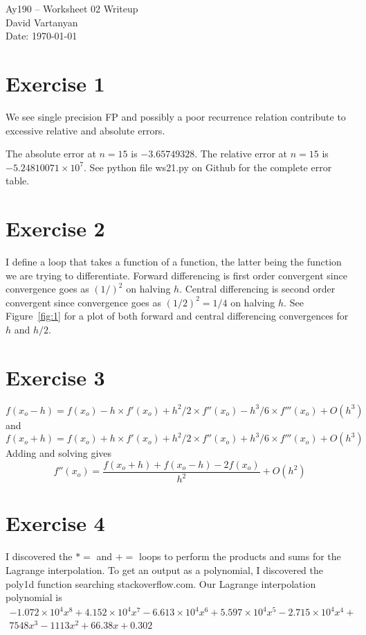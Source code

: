 \documentclass[11pt,letterpaper]{article}
\begin{document}
\begin{center}
\Large
Ay190 -- Worksheet 02 Writeup\\
David Vartanyan\\
Date: \today
\end{center}

\section{Exercise 1}
We see single precision FP and possibly a poor recurrence relation contribute to excessive relative and absolute errors.

The absolute error at $n=15$ is $-3.65749328$. \newline The relative error at $n=15$ is $-5.24810071 \times 10^7$. See python file ws21.py on Github for the complete error table.

\section{Exercise 2}
I define a loop that takes a function of a function, the latter being the function we are trying to differentiate. Forward differencing is first order convergent since convergence goes as $(1/)^2$ on halving $h$. Central differencing is second order convergent since convergence goes as $(1/2)^2=1/4$ on halving $h$. \newline See Figure~\ref{fig:1} for a plot of both forward and central differencing convergences for $h$ and $h/2$.



\section{Exercise 3}

\begin{equation}
f(x_o-h)= f(x_o) - h \times f'(x_o) + h^2/2 \times f''(x_o) - h^3/6 \times f'''(x_o) + O(h^3)
\end{equation}
and
\begin{equation}
f(x_o+h)= f(x_o) + h \times f'(x_o) + h^2/2 \times f''(x_o) + h^3/6 \times f'''(x_o) + O(h^3)
\end{equation}
Adding and solving gives
\begin{equation}
f''(x_o) = \frac{f(x_o+h)+f(x_o-h) - 2 f(x_o)}{h^2} + O(h^2)
\end{equation}

\section{Exercise 4}
I discovered the $*=$ and $+=$ loops to perform the products and sums for the Lagrange interpolation. To get an output as a polynomial, I discovered the poly1d function searching stackoverflow.com.  Our Lagrange interpolation polynomial is\begin{multline}-1.072 \times 10^4 x^8 + 4.152 \times 10^4 x^7 - 6.613 \times 10^4 x^6 + 5.597 \times 10^4 x^5 - 2.715 \times 10^4 x^4 +\\
 7548 x^3 - 1113 x^2 + 66.38 x + 0.302 \end{multline}
\end{document}
